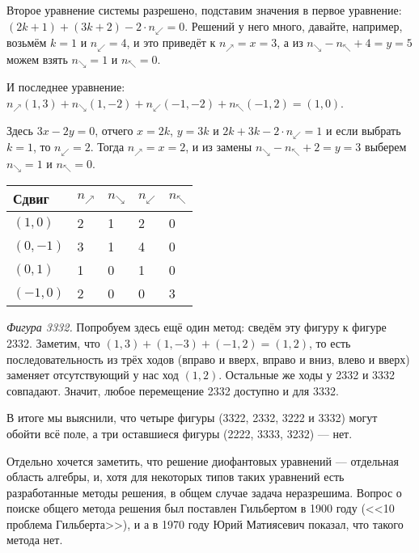 \begin{itemize}
Второе уравнение системы разрешено, подставим значения в первое уравнение:
$(2k + 1) + (3k + 2) -2\cdot n_\swarrow = 0$. Решений у него много, давайте, например, 
возьмём $k = 1$ и $n_\swarrow=4$, и это приведёт к $n_\nearrow = x = 3$, а из 
$n_\searrow - n_\nwarrow + 4 = y = 5$ можем взять $n_\searrow = 1$ и $n_\nwarrow = 0$.


И последнее уравнение:
$n_\nearrow(1,3) + n_\searrow(1,-2) + n_\swarrow(-1,-2) + n_\nwarrow(-1,2) = (1,0)$.

Здесь $3x - 2y = 0$, отчего $x = 2k$, $y = 3k$ и $2k + 3k - 2\cdot n_\swarrow = 1$ и
если выбрать $k=1$, то $n_\swarrow = 2$. Тогда $n_\nearrow = x = 2$, 
и из замены $n_\searrow - n_\nwarrow + 2 = y = 3$ выберем $n_\searrow = 1$ и $n_\nwarrow = 0$.


\begin{center}\begin{tabular}{lllll}
Сдвиг & $n_\nearrow$ & $n_\searrow$ & $n_\swarrow$ & $n_\nwarrow$ \\
\hline
$(1,0)$  & 2 & 1 & 2 & 0\\
$(0,-1)$ & 3 & 1 & 4 & 0\\
$(0,1)$  & 1 & 0 & 1 & 0\\
$(-1,0)$ & 2 & 0 & 0 & 3
\end{tabular}\end{center}

\emph{Фигура 3332.} Попробуем здесь ещё один метод: сведём эту фигуру к фигуре 2332. 
Заметим, что $(1,3)+(1,-3)+(-1,2) = (1,2)$, то есть последовательность из трёх ходов 
(вправо и вверх, вправо и вниз, влево и вверх) заменяет отсутствующий у нас ход $(1,2)$. 
Остальные же ходы у 2332 и 3332 совпадают. Значит, любое перемещение 2332 доступно и 
для 3332.

В итоге мы выяснили, что четыре фигуры (3322, 2332, 3222 и 3332) могут обойти всё поле, а три оставшиеся
фигуры (2222, 3333, 3232) --- нет.

Отдельно хочется заметить, что решение диофантовых уравнений --- отдельная область алгебры, и, хотя для некоторых
типов таких уравнений есть разработанные методы решения, в общем случае задача неразрешима. 
Вопрос о поиске общего метода решения был поставлен Гильбертом в 1900 году (<<10 проблема Гильберта>>), 
и а в 1970 году Юрий Матиясевич показал, что такого метода нет.

\end{itemize}

